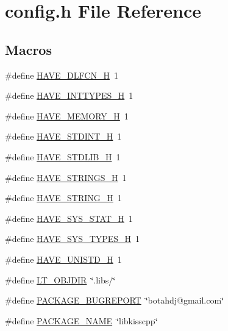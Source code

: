 \hypertarget{a00051}{\section{config.\-h File Reference}
\label{a00051}
}
\subsection*{Macros}
\begin{DoxyCompactItemize}
\item 
\#define \hyperlink{a00051_a0ee1617ff2f6885ef384a3dd46f9b9d7}{H\-A\-V\-E\-\_\-\-D\-L\-F\-C\-N\-\_\-\-H}~1
\item 
\#define \hyperlink{a00051_ab90a030ff2790ebdc176660a6dd2a478}{H\-A\-V\-E\-\_\-\-I\-N\-T\-T\-Y\-P\-E\-S\-\_\-\-H}~1
\item 
\#define \hyperlink{a00051_ae93a78f9d076138897af441c9f86f285}{H\-A\-V\-E\-\_\-\-M\-E\-M\-O\-R\-Y\-\_\-\-H}~1
\item 
\#define \hyperlink{a00051_ab6cd6d1c63c1e26ea2d4537b77148354}{H\-A\-V\-E\-\_\-\-S\-T\-D\-I\-N\-T\-\_\-\-H}~1
\item 
\#define \hyperlink{a00051_a9e0e434ec1a6ddbd97db12b5a32905e0}{H\-A\-V\-E\-\_\-\-S\-T\-D\-L\-I\-B\-\_\-\-H}~1
\item 
\#define \hyperlink{a00051_a405d10d46190bcb0320524c54eafc850}{H\-A\-V\-E\-\_\-\-S\-T\-R\-I\-N\-G\-S\-\_\-\-H}~1
\item 
\#define \hyperlink{a00051_ad4c234dd1625255dc626a15886306e7d}{H\-A\-V\-E\-\_\-\-S\-T\-R\-I\-N\-G\-\_\-\-H}~1
\item 
\#define \hyperlink{a00051_ace156430ba007d19b4348a950d0c692b}{H\-A\-V\-E\-\_\-\-S\-Y\-S\-\_\-\-S\-T\-A\-T\-\_\-\-H}~1
\item 
\#define \hyperlink{a00051_a69dc70bea5d1f8bd2be9740e974fa666}{H\-A\-V\-E\-\_\-\-S\-Y\-S\-\_\-\-T\-Y\-P\-E\-S\-\_\-\-H}~1
\item 
\#define \hyperlink{a00051_a219b06937831d0da94d801ab13987639}{H\-A\-V\-E\-\_\-\-U\-N\-I\-S\-T\-D\-\_\-\-H}~1
\item 
\#define \hyperlink{a00051_ac2d5925d76379847dd9fc4747b061659}{L\-T\-\_\-\-O\-B\-J\-D\-I\-R}~\char`\"{}.libs/\char`\"{}
\item 
\#define \hyperlink{a00051_a1d1d2d7f8d2f95b376954d649ab03233}{P\-A\-C\-K\-A\-G\-E\-\_\-\-B\-U\-G\-R\-E\-P\-O\-R\-T}~\char`\"{}botahdj@gmail.\-com\char`\"{}
\item 
\#define \hyperlink{a00051_a1c0439e4355794c09b64274849eb0279}{P\-A\-C\-K\-A\-G\-E\-\_\-\-N\-A\-M\-E}~\char`\"{}libkisscpp\char`\"{}

\end{DoxyCompactItemize}
